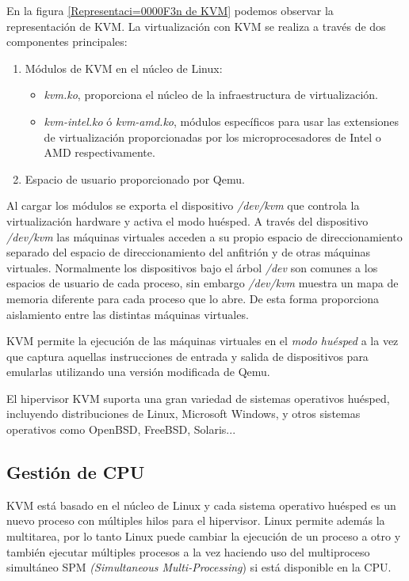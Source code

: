 \documentclass[spanisheDIVcalc,twoside,parskip-,pointlessnumbers,final]{scrbook}
\begin{document}
En la figura \ref{Representaci=0000F3n de KVM} podemos observar la
representación de KVM. La virtualización con KVM se realiza a través
de dos componentes principales:
\begin{enumerate}
\item Módulos de KVM en el núcleo de Linux:

\begin{itemize}
\item \emph{kvm.ko}, proporciona el núcleo de la infraestructura de virtualización.
\item \emph{kvm-intel.ko} ó \emph{kvm-amd.ko}, módulos específicos para
usar las extensiones de virtualización proporcionadas por los microprocesadores
de Intel o AMD respectivamente.
\end{itemize}
\item Espacio de usuario proporcionado por Qemu.
\end{enumerate}
Al cargar los módulos se exporta el dispositivo \emph{/dev/kvm} que
controla la virtualización hardware y activa el modo huésped. A través
del dispositivo \emph{/dev/kvm} las máquinas virtuales acceden a su
propio espacio de direccionamiento separado del espacio de direccionamiento
del anfitrión y de otras máquinas virtuales. Normalmente los dispositivos
bajo el árbol \emph{/dev} son comunes a los espacios de usuario de
cada proceso, sin embargo \emph{/dev/kvm} muestra un mapa de memoria
diferente para cada proceso que lo abre. De esta forma proporciona
aislamiento entre las distintas máquinas virtuales.

KVM permite la ejecución de las máquinas virtuales en el \emph{modo
huésped }a la vez que captura aquellas instrucciones de entrada y
salida de dispositivos para emularlas utilizando una versión modificada
de Qemu.

El hipervisor KVM suporta una gran variedad de sistemas operativos
huésped, incluyendo distribuciones de Linux, Microsoft Windows, y
otros sistemas operativos como OpenBSD, FreeBSD, Solaris...


\subsection{Gestión de CPU}

KVM está basado en el núcleo de Linux y cada sistema operativo huésped
es un nuevo proceso con múltiples hilos para el hipervisor. Linux
permite además la multitarea, por lo tanto Linux puede cambiar la
ejecución de un proceso a otro y también ejecutar múltiples procesos
a la vez haciendo uso del multiproceso simultáneo SPM \emph{(Simultaneous
Multi-Processing}) si está disponible en la CPU. 
\end{document}

